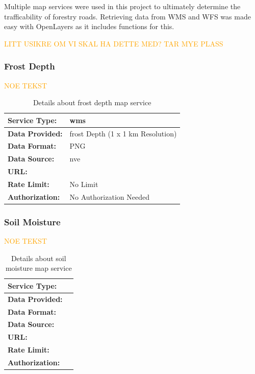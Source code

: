 Multiple map services were used in this project to ultimately determine the trafficability of forestry roads. Retrieving data from WMS and WFS was made easy with OpenLayers as it includes functions for this. 

\textcolor{orange}{LITT USIKRE OM VI SKAL HA DETTE MED? TAR MYE PLASS}

\subsubsection*{Frost Depth}

\textcolor{orange}{NOE TEKST}
\begin{table}[h]
    \centering
    \begin{tabularx}{\linewidth}{|l|X|}
        \hline
        \textbf{Service Type:} & \Gls{wms} \\
        \hline
        \textbf{Data Provided:} & \Gls{frost} Depth (1 x 1 km Resolution) \\
        \hline
        \textbf{Data Format:} & PNG \\
        \hline
        \textbf{Data Source:} & \Gls{nve} \\
        \hline
        \textbf{URL:} & \url{} \\
        \hline
        \textbf{Rate Limit:} & No Limit \\
        \hline
        \textbf{Authorization:} & No Authorization Needed \\
        \hline
    \end{tabularx}
    \caption{Details about frost depth map service}
    \label{tab:frost_map_service}
\end{table}

\subsubsection*{Soil Moisture}

\textcolor{orange}{NOE TEKST}
\begin{table}[h]
    \centering
    \begin{tabularx}{\linewidth}{|l|X|}
        \hline
        \textbf{Service Type:} &  \\
        \hline
        \textbf{Data Provided:} &  \\
        \hline
        \textbf{Data Format:} &  \\
        \hline
        \textbf{Data Source:} &  \\
        \hline
        \textbf{URL:} &  \\
        \hline
        \textbf{Rate Limit:} &  \\
        \hline
        \textbf{Authorization:} & \\
        \hline
    \end{tabularx}
    \caption{Details about soil moisture map service}
    \label{tab:soil_moisture_map_service}
\end{table}

